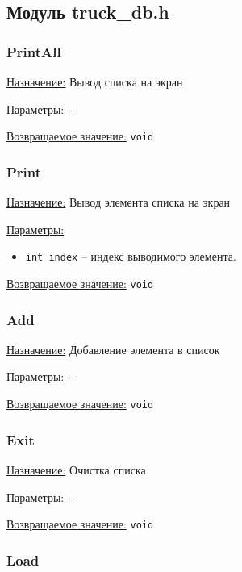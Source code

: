 \subsection*{Модуль truck\_db.h}


\subsubsection*{PrintAll}

\underline{Назначение:} Вывод списка на экран

\underline{Параметры:} \verb|-|

\underline{Возвращаемое значение:} \verb|void|


\subsubsection*{Print}

\underline{Назначение:} Вывод элемента списка на экран

\underline{Параметры:} 

\begin{itemize}
    \item \verb|int index| -- индекс выводимого элемента.
\end{itemize}

\underline{Возвращаемое значение:} \verb|void|


\subsubsection*{Add}

\underline{Назначение:} Добавление элемента в список

\underline{Параметры:} \verb|-|

\underline{Возвращаемое значение:} \verb|void|


\subsubsection*{Exit}

\underline{Назначение:} Очистка списка

\underline{Параметры:} \verb|-|

\underline{Возвращаемое значение:} \verb|void|


\subsubsection*{Load}

